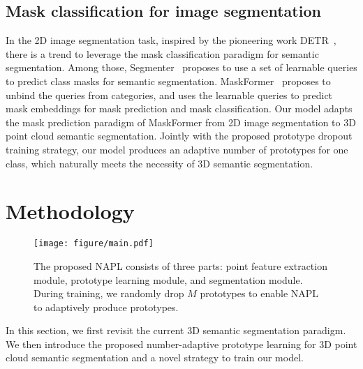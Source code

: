 \documentclass[runningheads]{llncs}
\begin{document}
\subsection{Mask classification for image segmentation}
In the 2D image segmentation task, inspired by the pioneering work DETR~\cite{carion2020end}, there is a trend to leverage the mask classification paradigm for semantic segmentation. 
Among those, Segmenter~\cite{strudel2021segmenter} proposes to use a set of learnable queries
to predict class masks for semantic segmentation. 
MaskFormer~\cite{cheng2021per} proposes to unbind the queries from categories, and uses the learnable queries to predict mask embeddings for mask prediction and mask classification. Our model adapts the mask prediction paradigm of MaskFormer from 2D image segmentation to 3D point cloud semantic segmentation. Jointly with the proposed prototype dropout training strategy, our model produces an adaptive number of prototypes for one class, which naturally meets the necessity of 3D semantic segmentation.

\section{Methodology}\label{sec:method}
\begin{figure}[t]
    \centering
    \texttt{[image: figure/main.pdf]}
    \caption{The proposed NAPL consists of three parts: point feature extraction module, prototype learning module, and segmentation module. During training, we randomly drop $M$ prototypes to enable NAPL to adaptively produce prototypes.}  
    \label{fig:NAPL}
\end{figure}

In this section, we first revisit the current 3D semantic segmentation paradigm. We then introduce the proposed number-adaptive prototype learning for 3D point cloud semantic segmentation and a novel strategy to train our model. 
\end{document}
